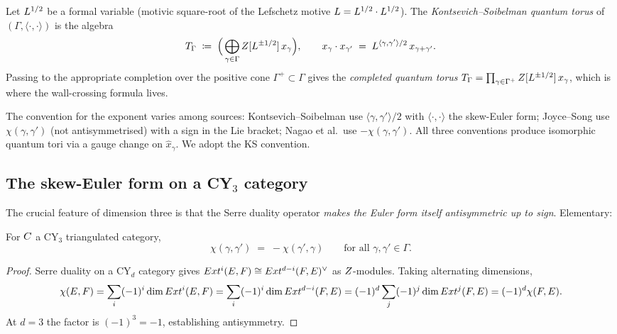 \begin{definition}
  \label{def:ks-quantum-torus}
  Let $L^{1/2}$ be a formal variable (motivic square-root of the Lefschetz
  motive $L = L^{1/2} \cdot L^{1/2}$). The \emph{Kontsevich--Soibelman
  quantum torus} of $(\Gamma, \langle \cdot, \cdot \rangle)$ is the algebra
  \[
    T_\Gamma \;\coloneqq\; \Big(\bigoplus_{\gamma \in \Gamma} Z[L^{\pm 1/2}] \,x_\gamma \Big),
    \qquad
    x_\gamma \cdot x_{\gamma'} \;=\; L^{\langle \gamma, \gamma' \rangle / 2}\, x_{\gamma + \gamma'}.
  \]
  Passing to the appropriate completion over the positive cone
  $\Gamma^+ \subset \Gamma$ gives the \emph{completed quantum torus}
  $T_\Gamma = \prod_{\gamma \in \Gamma^+} Z[L^{\pm 1/2}]\,x_\gamma$, which is where
  the wall-crossing formula lives.
\end{definition}

\begin{remark}[Conventions]
  The convention for the exponent varies among sources: Kontsevich--Soibelman
  use $\langle \gamma, \gamma' \rangle / 2$ with $\langle \cdot, \cdot \rangle$
  the skew-Euler form; Joyce--Song use $\chi(\gamma, \gamma')$ (not
  antisymmetrised) with a sign in the Lie bracket; Nagao et al.~use
  $-\chi(\gamma, \gamma')$. All three conventions produce isomorphic quantum
  tori via a gauge change on $\hat{x}_\gamma$. We adopt the KS convention.
\end{remark}

\subsection{The skew-Euler form on a CY$_3$ category}

The crucial feature of dimension three is that the Serre duality operator
\emph{makes the Euler form itself antisymmetric up to sign}. Elementary:

\begin{proposition}
  \label{prop:cy3-serre-antisymmetry}
  For $C$ a CY$_3$ triangulated category,
  \[
    \chi(\gamma, \gamma') \;=\; -\chi(\gamma', \gamma)
    \qquad \text{for all } \gamma, \gamma' \in \Gamma.
  \]
\end{proposition}

\begin{proof}
  Serre duality on a CY$_d$ category gives
  $Ext^i(E, F) \cong Ext^{d-i}(F, E)^\vee$ as $Z$-modules. Taking alternating
  dimensions,
  \[
    \chi(E, F) = \sum_i (-1)^i \dim Ext^i(E, F)
                = \sum_i (-1)^i \dim Ext^{d-i}(F, E)
                = (-1)^d \sum_j (-1)^j \dim Ext^j(F, E)
                = (-1)^d \chi(F, E).
  \]
  At $d = 3$ the factor is $(-1)^3 = -1$, establishing antisymmetry.
\end{proof}

